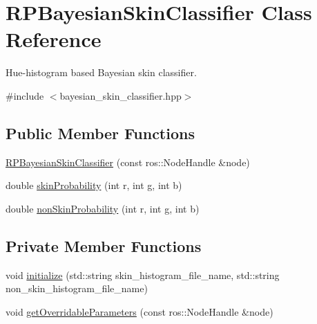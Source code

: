 \hypertarget{class_r_p_bayesian_skin_classifier}{\section{\-R\-P\-Bayesian\-Skin\-Classifier \-Class \-Reference}
\label{class_r_p_bayesian_skin_classifier}
}


\-Hue-\/histogram based \-Bayesian skin classifier.  




{\ttfamily \#include $<$bayesian\-\_\-skin\-\_\-classifier.\-hpp$>$}

\subsection*{\-Public \-Member \-Functions}
\begin{DoxyCompactItemize}
\item 
\hyperlink{class_r_p_bayesian_skin_classifier_a9a841d47a4dfcf95811ccb5a3c87bb4b}{\-R\-P\-Bayesian\-Skin\-Classifier} (const ros\-::\-Node\-Handle \&node)
\item 
double \hyperlink{class_r_p_bayesian_skin_classifier_a52bffb1354a2702a794468525fb6d944}{skin\-Probability} (int r, int g, int b)
\item 
double \hyperlink{class_r_p_bayesian_skin_classifier_a2c4f6355ca09d44768242a2bd7a43af7}{non\-Skin\-Probability} (int r, int g, int b)
\end{DoxyCompactItemize}
\subsection*{\-Private \-Member \-Functions}
\begin{DoxyCompactItemize}
\item 
void \hyperlink{class_r_p_bayesian_skin_classifier_a58579596539d8648cd07cd8d00a0dee0}{initialize} (std\-::string skin\-\_\-histogram\-\_\-file\-\_\-name, std\-::string non\-\_\-skin\-\_\-histogram\-\_\-file\-\_\-name)
\item 
void \hyperlink{class_r_p_bayesian_skin_classifier_a07b671b2ddc06012eec42d78379fde95}{get\-Overridable\-Parameters} (const ros\-::\-Node\-Handle \&node)
\end{DoxyCompactItemize}

